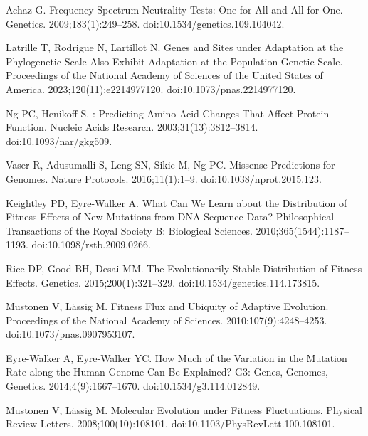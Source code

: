 \documentclass[10pt,letterpaper]{article}
\begin{document}
\begin{thebibliography}{10}
Achaz G.
\newblock Frequency {{Spectrum Neutrality Tests}}: {{One}} for {{All}} and
{{All}} for {{One}}.
\newblock Genetics. 2009;183(1):249--258.
\newblock doi:{10.1534/genetics.109.104042}.

Latrille T, Rodrigue N, Lartillot N.
\newblock Genes and Sites under Adaptation at the Phylogenetic Scale Also
Exhibit Adaptation at the Population-Genetic Scale.
\newblock Proceedings of the National Academy of Sciences of the United States
of America. 2023;120(11):e2214977120.
\newblock doi:{10.1073/pnas.2214977120}.

Ng PC, Henikoff S.
: Predicting Amino Acid Changes That Affect Protein Function.
\newblock Nucleic Acids Research. 2003;31(13):3812--3814.
\newblock doi:{10.1093/nar/gkg509}.

Vaser R, Adusumalli S, Leng SN, Sikic M, Ng PC.
 Missense Predictions for Genomes.
\newblock Nature Protocols. 2016;11(1):1--9.
\newblock doi:{10.1038/nprot.2015.123}.

Keightley PD, {Eyre-Walker} A.
\newblock What Can We Learn about the Distribution of Fitness Effects of New
Mutations from {{DNA}} Sequence Data?
\newblock Philosophical Transactions of the Royal Society B: Biological
Sciences. 2010;365(1544):1187--1193.
\newblock doi:{10.1098/rstb.2009.0266}.

Rice DP, Good BH, Desai MM.
\newblock The {{Evolutionarily Stable Distribution}} of {{Fitness Effects}}.
\newblock Genetics. 2015;200(1):321--329.
\newblock doi:{10.1534/genetics.114.173815}.

Mustonen V, L{\"a}ssig M.
\newblock Fitness Flux and Ubiquity of Adaptive Evolution.
\newblock Proceedings of the National Academy of Sciences.
2010;107(9):4248--4253.
\newblock doi:{10.1073/pnas.0907953107}.

{Eyre-Walker} A, {Eyre-Walker} YC.
\newblock How Much of the Variation in the Mutation Rate along the Human Genome
Can Be Explained?
\newblock G3: Genes, Genomes, Genetics. 2014;4(9):1667--1670.
\newblock doi:{10.1534/g3.114.012849}.

Mustonen V, L{\"a}ssig M.
\newblock Molecular {{Evolution}} under {{Fitness Fluctuations}}.
\newblock Physical Review Letters. 2008;100(10):108101.
\newblock doi:{10.1103/PhysRevLett.100.108101}.


\end{thebibliography}
\end{document}
